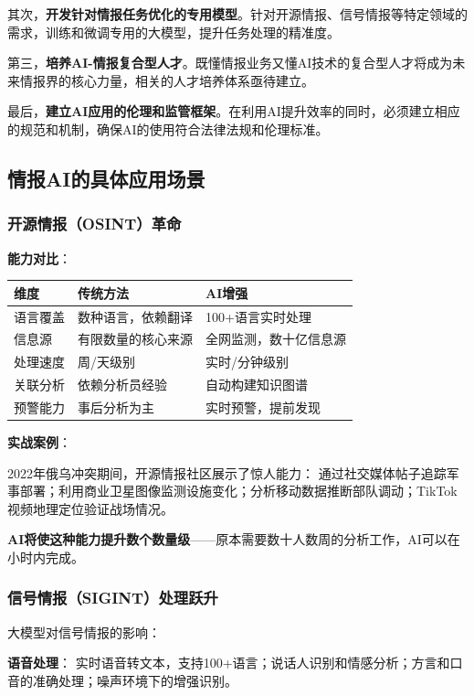 其次，\textbf{开发针对情报任务优化的专用模型}。针对开源情报、信号情报等特定领域的需求，训练和微调专用的大模型，提升任务处理的精准度。

第三，\textbf{培养AI-情报复合型人才}。既懂情报业务又懂AI技术的复合型人才将成为未来情报界的核心力量，相关的人才培养体系亟待建立。

最后，\textbf{建立AI应用的伦理和监管框架}。在利用AI提升效率的同时，必须建立相应的规范和机制，确保AI的使用符合法律法规和伦理标准。

\subsection{情报AI的具体应用场景}

\subsubsection{开源情报（OSINT）革命}

\textbf{能力对比}：

\begin{tabular}{p{3cm}p{4.5cm}p{4.5cm}}
\toprule
\textbf{维度} & \textbf{传统方法} & \textbf{AI增强} \\
\midrule
语言覆盖 & 数种语言，依赖翻译 & 100+语言实时处理 \\
信息源 & 有限数量的核心来源 & 全网监测，数十亿信息源 \\
处理速度 & 周/天级别 & 实时/分钟级别 \\
关联分析 & 依赖分析员经验 & 自动构建知识图谱 \\
预警能力 & 事后分析为主 & 实时预警，提前发现 \\
\bottomrule
\end{tabular}

\textbf{实战案例}：

2022年俄乌冲突期间，开源情报社区展示了惊人能力：
通过社交媒体帖子追踪军事部署；利用商业卫星图像监测设施变化；分析移动数据推断部队调动；TikTok视频地理定位验证战场情况。

\textbf{AI将使这种能力提升数个数量级}——原本需要数十人数周的分析工作，AI可以在小时内完成。

\subsubsection{信号情报（SIGINT）处理跃升}

大模型对信号情报的影响：

\textbf{语音处理}：
实时语音转文本，支持100+语言；说话人识别和情感分析；方言和口音的准确处理；噪声环境下的增强识别。

